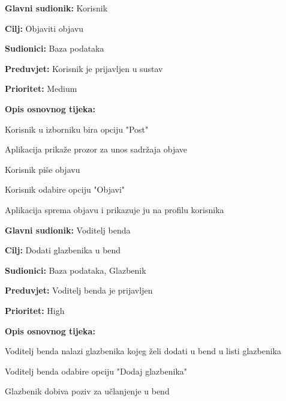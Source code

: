 \noindent {}
	\begin{packed_item}
		
		\item \textbf{Glavni sudionik: } Korisnik
		\item \textbf{Cilj:} Objaviti objavu
		\item \textbf{Sudionici:} Baza podataka
		\item \textbf{Preduvjet:} Korisnik je prijavljen u sustav
		\item \textbf{Prioritet:} Medium
		\item \textbf{Opis osnovnog tijeka:}
		
		\item[] \begin{packed_enum}
			
			\item Korisnik u izborniku bira opciju "Post"
			\item Aplikacija prikaže prozor za unos sadržaja objave
			\item Korisnik piše objavu
			\item Korisnik odabire opciju "Objavi"
			\item Aplikacija sprema objavu i prikazuje ju na profilu korisnika
		\end{packed_enum}
	\end{packed_item}

\noindent {}
	\begin{packed_item}
		
		\item \textbf{Glavni sudionik:} Voditelj benda
		\item \textbf{Cilj:} Dodati glazbenika u bend
		\item \textbf{Sudionici:} Baza podataka, Glazbenik
		\item \textbf{Preduvjet:} Voditelj benda je prijavljen 
		\item \textbf{Prioritet:} High
		\item \textbf{Opis osnovnog tijeka:} 
		
		\item[] \begin{packed_enum}
			\item Voditelj benda nalazi glazbenika kojeg želi dodati u bend u listi glazbenika
			\item Voditelj benda odabire opciju "Dodaj glazbenika" 
			\item Glazbenik dobiva poziv za učlanjenje u bend
		\end{packed_enum}
		
	\end{packed_item}	

